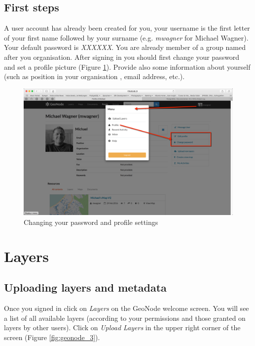 \documentclass[a4paper,12pt,titlepage]{article}
\begin{document}
\subsection{First steps}

A user account has already been created for you, your username is the first letter of your first name followed by your surname (e.g. \textit{mwagner} for Michael Wagner). Your default password is \textit{XXXXXX}. You are already member of a group named after you organisation. After signing in you should first change your password and set a profile picture (Figure \ref{fig:geonode_2}). Provide also some information about yourself (such as position in your organisation , email address, etc.).

\begin{figure}[H]
\centering
\includegraphics[width=12cm]{Images/geonode_2.png}
\caption{Changing your password and profile settings}\label{fig:geonode_2}
\end{figure}

\section{Layers}

\subsection{Uploading layers and metadata}

Once you signed in click on \textit{Layers} on the GeoNode welcome screen. You will see a list of all available layers (according to your permissions and those granted on layers by other users). Click on \textit{Upload Layers} in the upper right corner of the screen (Figure \ref{fig:geonode_3}).
\end{document}
